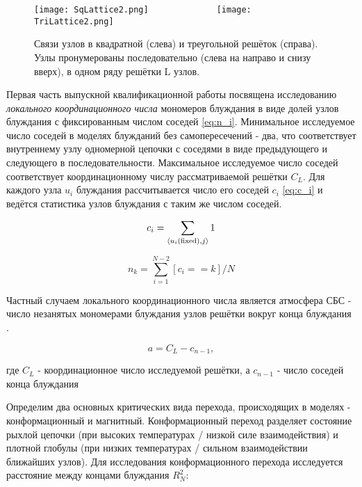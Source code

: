 \begin{figure}
    \centering
    \texttt{[image: SqLattice2.png]}\ \ \ \ \ \ \ \ \ \ \ \ \ \ 
    \texttt{[image: TriLattice2.png]}
    \caption{Связи узлов в квадратной (слева) и треугольной решёток (справа). 
	Узлы пронумерованы последовательно (слева на направо и снизу вверх), в одном ряду решётки L узлов.}
    \label{fig:lattices}
\end{figure}

Первая часть выпускной квалификационной работы посвящена исследованию \textit{локального координационного числа} мономеров блуждания
в виде долей узлов блуждания с фиксированным числом соседей \eqref{eq:n_i}.
Минимальное исследуемое число соседей в моделях блужданий без самопересечений - два, что соответствует внутреннему узлу одномерной цепочки с соседями в виде предыдующего и следующего в последовательности.
Максимальное исследуемое число соседей соответствует координационному числу рассматриваемой решётки $C_L$. 
Для каждого узла $u_i$ блуждания рассчитывается число его соседей $c_i$ \eqref{eq:c_i} и ведётся статистика узлов блуждания с таким же числом соседей.

\begin{equation}
\label{eq:c_i}
c_i = \sum_{\langle u_i \textup{(fixed)}, j \rangle} 1
\end{equation}

\begin{equation}
\label{eq:n_i}
n_k = \sum_{i=1}^{N-2}[c_i == k] / N
\end{equation}

Частный случаем локального координационного числа является атмосфера СБС - число незанятых мономерами блуждания узлов решётки вокруг конца блуждания \cite{owczarek2008scaling}.

\begin{equation}
\label{eq:atm}
a = C_L - c_{n-1},
\end{equation}

где $C_L$ - координационное число исследуемой решётки, а $c_{n-1}$ - число соседей конца блуждания

Определим два основных критических вида перехода, происходящих в моделях - конформационный и магнитный.
Конформационный переход разделяет состояние рыхлой цепочки (при высоких температурах / низкой силе взаимодействия) и плотной глобулы (при низких температурах / сильном взаимодействии ближайших узлов).
Для исследования конформационного перехода исследуется расстояние между концами блуждания $R^2_N$:
 
